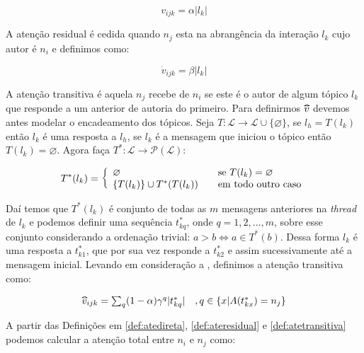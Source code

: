 \begin{equation}
\label{def:atedireta}
v_{ijk} = \alpha |l_k| 
\end{equation}

A atenção residual é cedida quando $n_j$ esta na abrangência da interação $l_k$
cujo autor é $n_i$ e definimos como:

\begin{equation}
\label{def:ateresidual}
\dot{v}_{ijk} = \beta |l_k|
\end{equation}

A atenção transitiva é aquela $n_j$ recebe de $n_i$ se este é o autor de algum
tópico $l_k$ que responde a um anterior de autoria do primeiro. Para definirmos
$\widetriangle{v}$ devemos antes modelar o encadeamento dos tópicos. Seja
$T:\mathscr{L}\to \mathscr{L}\cup\{\varnothing\}$, se $l_h=T(l_k)$ então
$l_k$ é uma resposta a $l_h$, se $l_k$ é a mensagem que iniciou o tópico então
$T(l_k)=\varnothing$. Agora faça $T^*:\mathscr{L}\to\mathscr{P}(\mathscr{L})$:

\begin{equation}
\label{def:thread}
T^*(l_k) = \left\{ \begin{array}{l l} \varnothing &\quad\text{se
$T(l_k)=\varnothing$}\\ \{T(l_k)\} \cup T^*(T(l_k)) &\quad\text{em todo outro
caso}\end{array} \right.
\end{equation}

Daí temos que $T^*(l_k)$ é conjunto de todas as $m$ mensagens anteriores na
\emph{thread} de $l_k$ e podemos definir uma sequência $t^*_{kq}$, onde
$q=1,2,\ldots,m$, sobre esse conjunto considerando a ordenação trivial: $a > b
\iff a\in T^*(b)$. Dessa forma $l_k$ é uma resposta a $t^*_{k1}$, que por sua
vez responde a $t^*_{k2}$ e assim sucessivamente até a mensagem inicial. Levando em
consideração a , definimos a atenção transitiva como:

\begin{equation}
\label{def:atetransitiva}
\begin{array}{ l l }
\widetriangle{v}_{ijk} = \sum_{q}(1-\alpha)\gamma^q|t^*_{kq}| 
&, q \in \{x | A(t^*_{kx}) = n_j\}
\end{array}
\end{equation}

A partir das Definições em \ref{def:atedireta}, \ref{def:ateresidual} e
\ref{def:atetransitiva} podemos calcular a atenção total entre $n_i$ e $n_j$
como:

